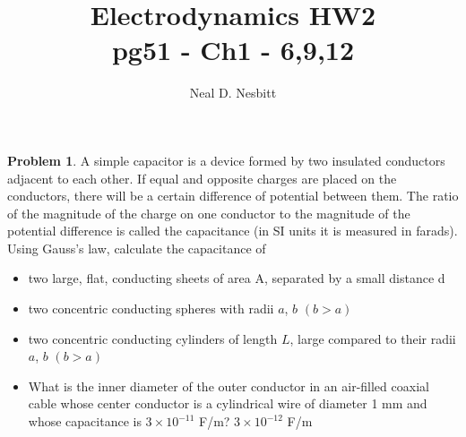 \documentclass{article}
\title{Electrodynamics HW2\\
pg51 - Ch1 - 6,9,12}
\author{Neal D. Nesbitt}
\begin{document}
\maketitle

\theoremstyle{definition}
\newtheorem{problem}{Problem}

\setcounter{problem}{5}
\begin{problem}
	A simple capacitor is a device formed by two insulated conductors adjacent to each other. If equal and opposite charges are placed on the conductors, there will be a certain difference of potential between them. The ratio of the magnitude of the charge on one conductor to the magnitude of the potential difference is called the capacitance (in SI units it is measured in farads). Using Gauss's law, calculate the capacitance of
	\begin{itemize}
		\item two large, flat, conducting sheets of area A, separated by a small distance d
		\item two concentric conducting spheres with radii $a$, $b$ $(b>a)$
		\item two concentric conducting cylinders of length $L$, large compared to their radii $a$, $b$ $(b>a)$
		\item What is the inner diameter of the outer conductor in an air-filled coaxial cable whose center conductor is a cylindrical wire of diameter 1 mm and whose capacitance is $3\times 10^{-11}$ F/m? $3\times 10^{-12}$ F/m
	\end{itemize}
\end{problem}
\end{document}
